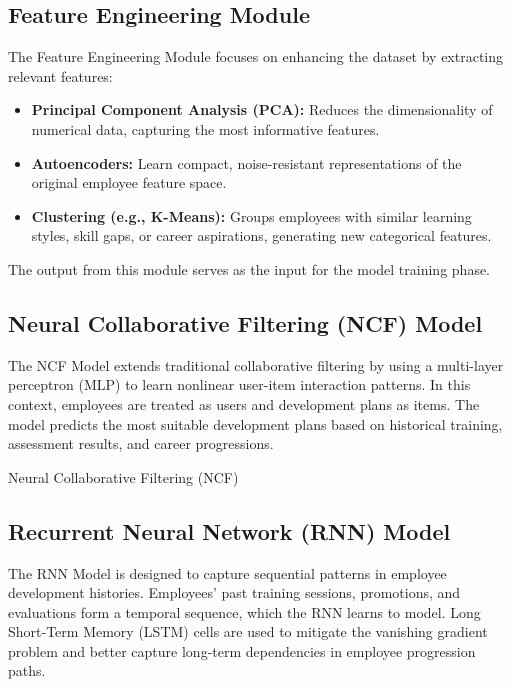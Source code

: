 \subsection{Feature Engineering Module}
The Feature Engineering Module focuses on enhancing the dataset by extracting relevant features:
\begin{itemize}
    \item \textbf{Principal Component Analysis (PCA):} Reduces the dimensionality of numerical data, capturing the most informative features.
    \item \textbf{Autoencoders:} Learn compact, noise-resistant representations of the original employee feature space.
    \item \textbf{Clustering (e.g., K-Means):} Groups employees with similar learning styles, skill gaps, or career aspirations, generating new categorical features.
\end{itemize}
The output from this module serves as the input for the model training phase.

\subsection{Neural Collaborative Filtering (NCF) Model}
The NCF Model extends traditional collaborative filtering by using a multi-layer perceptron (MLP) to learn nonlinear user-item interaction patterns. In this context, employees are treated as users and development plans as items. The model predicts the most suitable development plans based on historical training, assessment results, and career progressions.

\begin{algorithm}[H]
\DontPrintSemicolon
\caption{Neural Collaborative Filtering (NCF)}
\label{alg:ncf}


\end{algorithm}

\subsection{Recurrent Neural Network (RNN) Model}
The RNN Model is designed to capture sequential patterns in employee development histories. Employees' past training sessions, promotions, and evaluations form a temporal sequence, which the RNN learns to model. Long Short-Term Memory (LSTM) cells are used to mitigate the vanishing gradient problem and better capture long-term dependencies in employee progression paths.

